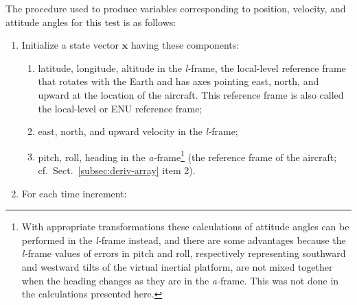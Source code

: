 \documentclass[12pt,twoside,english,12pt,twoside,english]{article}\usepackage[]{graphicx}\usepackage[]{color}
\let\OrgIndex\index
\renewcommand*{\index}[1]{\OrgIndex{#1}}
\begin{document}
The procedure used to produce variables
corresponding to position, velocity, and attitude angles
for this test is as follows:
\begin{enumerate}
\item Initialize a state vector $\mathbf{x}$ having
these components:

\begin{enumerate}
\item {}latitude, longitude, altitude
in the \emph{l-}frame,
the local-level reference frame that rotates with the Earth and has
axes pointing east, north, and upward at the location of the aircraft.
This reference frame is also called the local-level or ENU reference
frame;
\item east, north, and upward velocity in the \emph{l-}frame;
\item {}pitch, roll, heading
in the \emph{a-}frame\footnote{With appropriate transformations these calculations of attitude angles
can be performed in the \emph{l-}frame instead, and there are some
advantages because the \emph{l-}frame values of errors
in pitch and roll, respectively representing southward and westward
tilts of the virtual inertial platform, are not mixed together when
the heading changes as they are in the \emph{a-}frame. This was not
done in the calculations presented here.} (the reference frame of the aircraft; cf.~Sect.~\ref{subsec:deriv-array}
item 2).
\end{enumerate}
\item For each time increment:


\end{enumerate}
\end{document}
